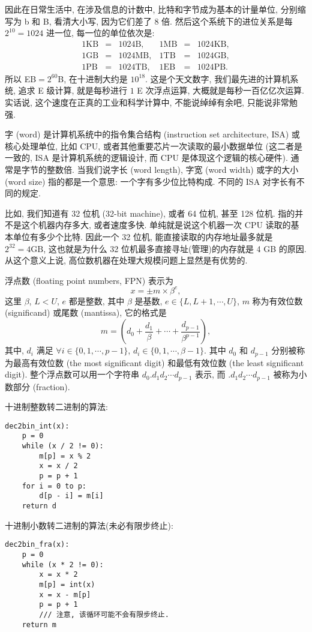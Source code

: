 \documentclass[a4paper]{ctexart}
\begin{document}
{因此在日常生活中, 在涉及信息的计数中, 比特和字节成为基本的计量单位,
分别缩写为 b 和 B, 看清大小写, 因为它们差了 8 倍.
然后这个系统下的进位关系是每 $2^{10} = 1024$ 进一位, 每一位的单位依次是:
$$
\begin{array}{rcllrcl}
1 \mbox{KB} &=& 1024 \mbox{B},& 1 \mbox{MB} &=& 1024 \mbox{KB},\\
1 \mbox{GB} &=& 1024 \mbox{MB},& 1 \mbox{TB} &=& 1024 \mbox{GB},\\
1 \mbox{PB} &=& 1024 \mbox{TB},& 1 \mbox{EB} &=& 1024 \mbox{PB}.
\end{array}
$$
所以 EB$=2^{60}$B, 在十进制大约是 $10^{18}$. 这是个天文数字,
我们最先进的计算机系统, 追求 E 级计算, 就是每秒进行 $1$ E 次浮点运算,
大概就是每秒一百亿亿次运算. 实话说, 这个速度在正真的工业和科学计算中,
不能说绰绰有余吧, 只能说非常勉强.

 字 (word) 是计算机系统中的指令集合结构
(instruction set architecture, ISA) 或核心处理单位, 比如 CPU,
或者其他重要芯片一次读取的最小数据单位 (这二者是一致的, ISA 是计算机系统的逻辑设计,
而 CPU 是体现这个逻辑的核心硬件). 通常是字节的整数倍.
当我们说字长 (word length), 字宽 (word width) 或字的大小 (word size)
指的都是一个意思: 一个字有多少位比特构成. 不同的 ISA 对字长有不同的规定.

 比如, 我们知道有 32 位机 (32-bit machine),
或者 64 位机, 甚至 128 位机. 指的并不是这个机器内存多大, 或者速度多快.
单纯就是说这个机器一次 CPU 读取的基本单位有多少个比特. 因此一个 32 位机,
能直接读取的内存地址最多就是 $2^{32} = 4\mbox{GB}$,
这也就是为什么 32 位机最多直接寻址(管理)的内存就是 4 GB 的原因.
从这个意义上说, 高位数机器在处理大规模问题上显然是有优势的. 

 浮点数 (floating point numbers, FPN)
表示为
$$
x = \pm m \times \beta^e,
$$
这里 $\beta$, $L < U$, $e$ 都是整数, 其中 $\beta$ 是基数,
$e \in \{L, L + 1, \cdots, U\}$,
$m$ 称为有效位数 (significand) 或尾数 (mantissa), 它的格式是
$$
m = \left(d_0 + \frac{d_1}{\beta} + \cdots
+ \frac{d_{p - 1}}{\beta^{p - 1}}\right),
$$
其中, $d_i$ 满足 $\forall i \in \{0, 1, \cdots, p - 1\}$,
$d_i \in \{0, 1, \cdots, \beta - 1\}$. 其中 $d_0$ 和
$d_{p - 1}$ 分别被称为最高有效位数 (the most significant digit)
和最低有效位数 (the least significant digit).
整个浮点数可以用一个字符串 $d_0.d_1d_2\cdots d_{p - 1}$ 表示, 而
$.d_1d_2\cdots d_{p - 1}$ 被称为小数部分 (fraction).

 十进制整数转二进制的算法:
\begin{verbatim}
dec2bin_int(x):
    p = 0
    while (x / 2 != 0):
        m[p] = x % 2
        x = x / 2
        p = p + 1
    for i = 0 to p:
        d[p - i] = m[i]
    return d
\end{verbatim}
十进制小数转二进制的算法(未必有限步终止):
\begin{verbatim}
dec2bin_fra(x):
    p = 0
    while (x * 2 != 0):
        x = x * 2
        m[p] = int(x)
        x = x - m[p]
        p = p + 1
        /// 注意, 该循环可能不会有限步终止.
    return m
\end{verbatim}

}
\end{document}

